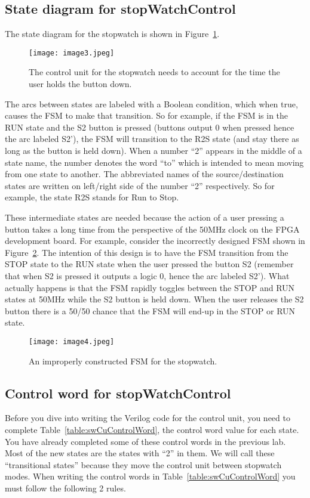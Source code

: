 \subsection{State diagram for stopWatchControl}
The state diagram for the stopwatch is shown in Figure~\ref{fig:swCuStateDiagram}.
\begin{figure}[ht]
    \texttt{[image: image3.jpeg]}
    \caption{The control unit for the stopwatch needs to account for the
    time the user holds the button down.}
    \label{fig:swCuStateDiagram}
\end{figure}
The arcs between states are labeled with a Boolean condition, which when
true, causes the FSM to make that transition. So for example, if the FSM
is in the RUN state and the S2 button is pressed (buttons output 0 when
pressed hence the arc labeled S2'), the FSM will transition to the R2S
state (and stay there as long as the button is held down). When a number
``2'' appears in the middle of a state name, the number denotes the word
``to'' which is intended to mean moving from one state to another. The
abbreviated names of the source/destination states are written on
left/right side of the number ``2'' respectively. So for example, the
state R2S stands for Run to Stop.

These intermediate states are needed because the action of a user
pressing a button takes a long time from the perspective of the 50MHz
clock on the FPGA development board. For example, consider the incorrectly designed FSM
shown in Figure~\ref{fig:swCuImproperFsm}. The intention of this design is to have the FSM
transition from the STOP state to the RUN state when the user pressed
the button S2 (remember that when S2 is pressed it outputs a logic 0,
hence the arc labeled S2'). What actually happens is that the FSM
rapidly toggles between the STOP and RUN states at 50MHz while the S2
button is held down. When the user releases the S2 button there is a
50/50 chance that the FSM will end-up in the STOP or RUN state.

\begin{figure}[ht]
    \texttt{[image: image4.jpeg]}
    \caption{An improperly constructed FSM for the stopwatch.}
    \label{fig:swCuImproperFsm}
\end{figure}

\subsection{Control word for stopWatchControl}
Before you dive into writing the Verilog code for the control unit, you
need to complete Table~\ref{table:swCuControlWord}, the control word value for each state. You
have already completed some of these control words in the previous lab.
Most of the new states are the states with ``2'' in them. We will call
these ``transitional states'' because they move the control unit between
stopwatch modes. When writing the control words in Table~\ref{table:swCuControlWord} you must
follow the following 2 rules.

